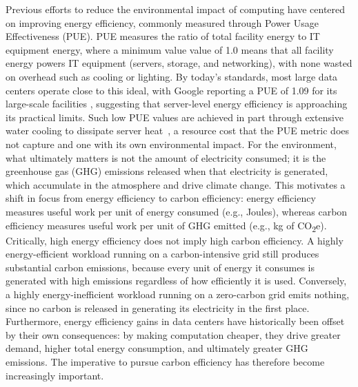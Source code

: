 Previous efforts to reduce the environmental impact of computing have centered on improving energy efficiency, commonly measured through Power Usage Effectiveness (PUE).
PUE measures the ratio of total facility energy to IT equipment energy, where a minimum value value of 1.0 means that all facility energy powers IT equipment (servers, storage, and networking), with none wasted on overhead such as cooling or lighting. 
By today's standards, most large data centers operate close to this ideal, with Google reporting a PUE of 1.09 for its large-scale facilities \cite{google_power_usage_effectiveness}, suggesting that server-level energy efficiency is approaching its practical limits.
Such low PUE values are achieved in part through extensive water cooling to dissipate server heat~\cite{google_water_cooling_2022}, a resource cost that the PUE metric does not capture and one with its own environmental impact.
For the environment, what ultimately matters is not the amount of electricity consumed; it is the greenhouse gas (GHG) emissions released when that electricity is generated, which accumulate in the atmosphere and drive climate change.
This motivates a shift in focus from energy efficiency to carbon efficiency: energy efficiency measures useful work per unit of energy consumed (e.g., Joules), whereas carbon efficiency measures useful work per unit of GHG emitted (e.g., kg of CO\textsubscript{2}e).
Critically, high energy efficiency does not imply high carbon efficiency.
A highly energy-efficient workload running on a carbon-intensive grid still produces substantial carbon emissions, because every unit of energy it consumes is generated with high emissions regardless of how efficiently it is used. Conversely, a highly energy-inefficient workload running on a zero-carbon grid emits nothing, since no carbon is released in generating its electricity in the first place.
Furthermore, energy efficiency gains in data centers have historically been offset by their own consequences: by making computation cheaper, they drive greater demand, higher total energy consumption, and ultimately greater GHG emissions. The imperative to pursue carbon efficiency has therefore become increasingly important. 

